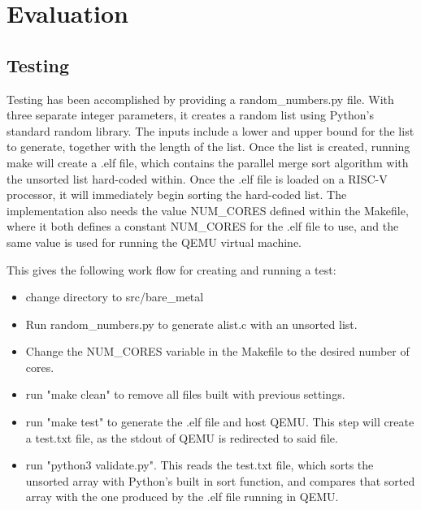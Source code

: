 \section{Evaluation}
\subsection{Testing}
Testing has been accomplished by providing a random\_numbers.py file. With three
separate integer parameters, it creates a random list using Python's standard
random library. The inputs include a lower and upper bound for the list to
generate, together with the length of the list. Once the list is created,
running make will create a .elf file, which contains the parallel merge sort
algorithm with the unsorted list hard-coded within. Once the .elf file is loaded
on a RISC-V processor, it will immediately begin sorting the hard-coded list. The
implementation also needs the value NUM\_CORES defined within the Makefile, where
it both defines a constant NUM\_CORES for the .elf file to use, and the same
value is used for running the QEMU virtual machine.

This gives the following work flow for creating and running a test:
\begin{itemize}
  \item change directory to src/bare\_metal
  \item Run random\_numbers.py to generate alist.c with an unsorted list.
  \item Change the NUM\_CORES variable in the Makefile to the desired number of
    cores.
  \item run "make clean" to remove all files built with previous settings.
  \item run "make test" to generate the .elf file and host QEMU. This step will
    create a test.txt file, as the stdout of QEMU is redirected to said file.
  \item run "python3 validate.py". This reads the test.txt file, which sorts the
    unsorted array with Python's built in sort function, and compares that sorted
    array with the one produced by the .elf file running in QEMU.
\end{itemize}

